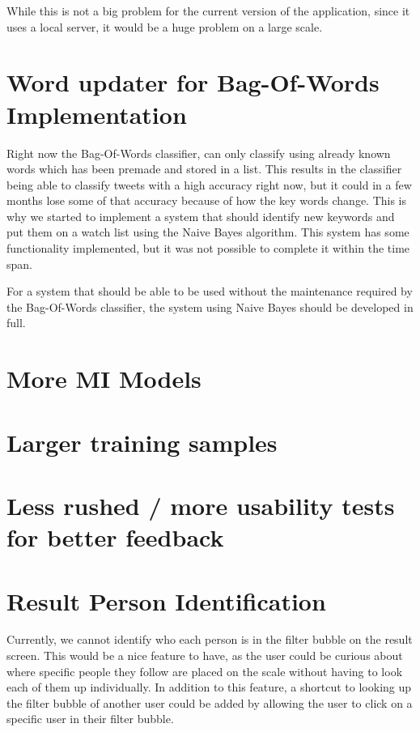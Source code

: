 While this is not a big problem for the current version of the application,
since it uses a local server, it would be a huge problem on a large scale. 

\section{Word updater for Bag-Of-Words Implementation}
Right now the Bag-Of-Words classifier, can only classify using already known
words which has been premade and stored in a list. This results in the
classifier being able to classify tweets with a high accuracy right now, but it
could in a few months lose some of that accuracy because of how the key words 
change. This is why we started to implement a system that should identify new
keywords and put them on a watch list using the Naive Bayes algorithm. This
system has some functionality implemented, but it was not possible to complete it within the time span.

For a system that should be able to be used without the maintenance required by
the Bag-Of-Words classifier, the system using Naive Bayes should be developed in
full.

\section{More MI  Models}

\section{Larger training samples}

\section{Less rushed / more usability tests for better feedback}

\section{Result Person Identification}
Currently, we cannot identify who each person is in the filter bubble on the
result screen. This would be a nice feature to have, as the user could be
curious about where specific people they follow are placed on the scale without
having to look each of them up individually. In addition to this feature, a
shortcut to looking up the filter bubble of another user could be added by
allowing the user to click on a specific user in their filter bubble.


